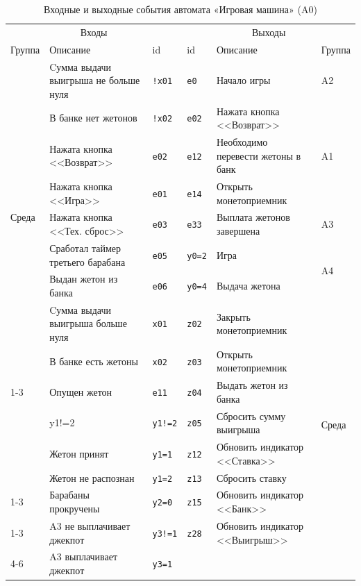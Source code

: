 \begin{table}[H]
\centering
\caption{Входные и выходные события автомата «Игровая машина» (A0)}
\small
\begin{tabular}{@{}p{1.3cm}p{4.6cm}l|lp{4.6cm}p{1.3cm}@{}}
\toprule
\multicolumn{3}{c}{Входы} & \multicolumn{3}{c}{Выходы} \\
Группа & Описание & id & id & Описание & Группа \\
\midrule
\multirow{9}{*}{Среда} & Cумма выдачи выигрыша не больше нуля & \texttt{!x01} & \texttt{e0} & Начало игры & \multirow{1}{*}{A2} \\
\cline{4-6}
 & В банке нет жетонов & \texttt{!x02} & \texttt{e02} & Нажата кнопка <<Возврат>> & \multirow{3}{*}{A1} \\
 & Нажата кнопка <<Возврат>> & \texttt{e02} & \texttt{e12} & Необходимо перевести жетоны в банк &  \\
 & Нажата кнопка <<Игра>> & \texttt{e01} & \texttt{e14} & Открыть монетоприемник &  \\
\cline{4-6}
 & Нажата кнопка <<Тех. сброс>> & \texttt{e03} & \texttt{e33} & Выплата жетонов завершена & \multirow{1}{*}{A3} \\
\cline{4-6}
 & Сработал таймер третьего барабана & \texttt{e05} & \texttt{y0=2} & Игра & \multirow{2}{*}{A4} \\
 & Выдан жетон из банка & \texttt{e06} & \texttt{y0=4} & Выдача жетона &  \\
\cline{4-6}
 & Cумма выдачи выигрыша больше нуля & \texttt{x01} & \texttt{z02} & Закрыть монетоприемник & \multirow{8}{*}{Среда} \\
 & В банке есть жетоны & \texttt{x02} & \texttt{z03} & Открыть монетоприемник &  \\
\cline{1-3}
\multirow{4}{*}{A1} & Опущен жетон & \texttt{e11} & \texttt{z04} & Выдать жетон из банка &  \\
 & y1!=2 & \texttt{y1!=2} & \texttt{z05} & Сбросить сумму выигрыша &  \\
 & Жетон принят & \texttt{y1=1} & \texttt{z12} & Обновить индикатор <<Ставка>> &  \\
 & Жетон не распознан & \texttt{y1=2} & \texttt{z13} & Сбросить ставку &  \\
\cline{1-3}
\multirow{1}{*}{A2} & Барабаны прокручены & \texttt{y2=0} & \texttt{z15} & Обновить индикатор <<Банк>> &  \\
\cline{1-3}
\multirow{2}{*}{A3} & A3 не выплачивает джекпот & \texttt{y3!=1} & \texttt{z28} & Обновить индикатор <<Выигрыш>> &  \\
\cline{4-6}
 & A3 выплачивает джекпот & \texttt{y3=1} &  &  &  \\
\bottomrule
\end{tabular}
\end{table}